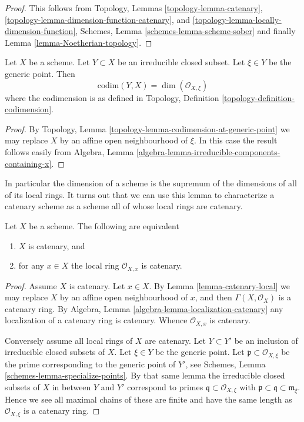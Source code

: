 \begin{proof}
This follows from
Topology, Lemmas
\ref{topology-lemma-catenary},
\ref{topology-lemma-dimension-function-catenary}, and
\ref{topology-lemma-locally-dimension-function},
Schemes, Lemma \ref{schemes-lemma-scheme-sober}
and finally Lemma \ref{lemma-Noetherian-topology}.
\end{proof}

\begin{lemma}
\label{lemma-codimension-local-ring}
Let $X$ be a scheme. Let $Y \subset X$ be an irreducible closed
subset. Let $\xi \in Y$ be the generic point. Then
$$
\text{codim}(Y, X) = \dim(\mathcal{O}_{X, \xi})
$$
where the codimension is as defined in
Topology, Definition \ref{topology-definition-codimension}.
\end{lemma}

\begin{proof}
By Topology, Lemma \ref{topology-lemma-codimension-at-generic-point}
we may replace $X$ by an affine open neighbourhood of $\xi$. In this
case the result follows easily from
Algebra, Lemma \ref{algebra-lemma-irreducible-components-containing-x}.
\end{proof}

\noindent
In particular the dimension of a scheme is the supremum of
the dimensions of all of its local rings. It turns out that
we can use this lemma to characterize a catenary scheme as a
scheme all of whose local rings are catenary.

\begin{lemma}
\label{lemma-catenary-local-rings-catenary}
Let $X$ be a scheme. The following are equivalent
\begin{enumerate}
\item $X$ is catenary, and
\item for any $x \in X$ the local ring $\mathcal{O}_{X, x}$ is
catenary.
\end{enumerate}
\end{lemma}

\begin{proof}
Assume $X$ is catenary. Let $x \in X$. By Lemma \ref{lemma-catenary-local}
we may replace $X$ by an affine open neighbourhood of $x$, and
then $\Gamma(X, \mathcal{O}_X)$ is a catenary ring. By
Algebra, Lemma \ref{algebra-lemma-localization-catenary} any
localization of a catenary ring is
catenary. Whence $\mathcal{O}_{X, x}$ is catenary.

\medskip\noindent
Conversely assume all local rings of $X$ are catenary.
Let $Y \subset Y'$ be an inclusion of irreducible closed
subsets of $X$. Let $\xi \in Y$ be the generic point.
Let $\mathfrak p \subset \mathcal{O}_{X, \xi}$ be the prime
corresponding to the generic point of $Y'$, see
Schemes, Lemma \ref{schemes-lemma-specialize-points}. By that same
lemma the irreducible closed subsets of $X$ in between $Y$ and $Y'$
correspond to primes $\mathfrak q \subset \mathcal{O}_{X, \xi}$
with $\mathfrak p \subset \mathfrak q \subset \mathfrak m_{\xi}$.
Hence we see all maximal chains of these are finite and have the
same length as $\mathcal{O}_{X, \xi}$ is a catenary ring.
\end{proof}







